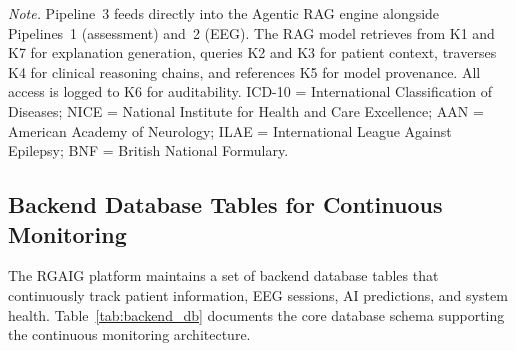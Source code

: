 \vspace{0.5em}
\noindent\textit{Note.} Pipeline~3 feeds directly into the Agentic RAG engine alongside Pipelines~1 (assessment) and~2 (EEG). The RAG model retrieves from K1 and K7 for explanation generation, queries K2 and K3 for patient context, traverses K4 for clinical reasoning chains, and references K5 for model provenance. All access is logged to K6 for auditability. ICD-10 = International Classification of Diseases; NICE = National Institute for Health and Care Excellence; AAN = American Academy of Neurology; ILAE = International League Against Epilepsy; BNF = British National Formulary.
\fi %

\label{tab:knowledge_pipeline}

\iffalse %
\subsection{Backend Database Tables for Continuous Monitoring}
\label{sec:backend_tables}

The RGAIG platform maintains a set of backend database tables that continuously track patient information, EEG sessions, AI predictions, and system health. Table~\ref{tab:backend_db} documents the core database schema supporting the continuous monitoring architecture.


